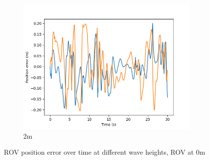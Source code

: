 \documentclass[class=article, crop=false]{standalone}
\begin{document}
\begin{figure}
\begin{subfigure}[b]{0.48\textwidth}
        \centering
        \includegraphics{scenario1/rov-0m/2.0m/rov_position_error_controlled}
        \caption{2m}
        \label{}
    \end{subfigure}

    \caption{ROV position error over time at different wave heights, ROV at 0m}
\end{figure}
\end{document}

